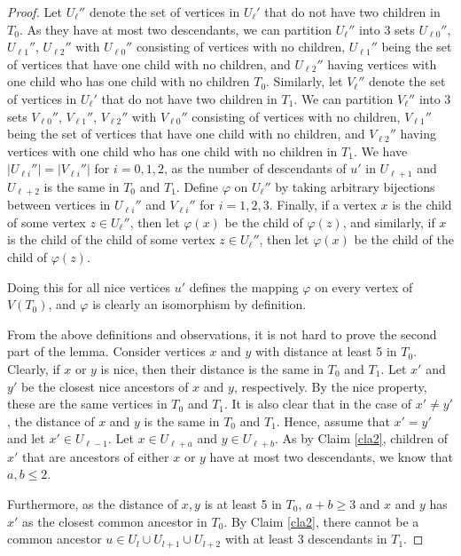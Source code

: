 \documentclass[10pt,a4paper]{amsart}
\begin{document}
\begin{proof}
Let $U_\ell''$ denote the set of vertices in $U_\ell'$ that do not have two children in $T_0$. As they have at most two descendants, we can partition $U_\ell''$ into $3$ sets $U_{\ell 0}''$, $U_{\ell 1}''$, $U_{\ell 2}''$ with $U_{\ell 0}''$ consisting of vertices with no children, $U_{\ell 1}''$ being the set of vertices that have one child with no children, and $U_{\ell 2}''$ having vertices with one child who has one child with no children $T_0$. Similarly, let $V_\ell''$ denote the set of vertices in $U_\ell'$ that do not have two children in $T_1$. We can partition $V_\ell''$ into $3$ sets $V_{\ell 0}''$, $V_{\ell 1}''$, $V_{\ell 2}''$ with $V_{\ell 0}''$ consisting of vertices with no children, $V_{\ell 1}''$ being the set of vertices that have one child with no children, and $V_{\ell 2}''$ having vertices with one child who has one child with no children in $T_1$. 
We have $|U_{\ell i}''|=|V_{\ell i}''|$ for $i=0,1,2$, as the number of descendants of $u'$ in $U_{\ell+1}$ and $U_{\ell+2}$ is the same in $T_0$ and $T_1$.
Define $\varphi$ on $U_\ell''$ by taking arbitrary bijections between vertices in $U_{\ell i}''$ and $V_{\ell i}''$ for $i=1,2,3$. Finally, if a vertex $x$ is the child of some vertex $z \in U_\ell''$, then let $\varphi(x)$ be the child of $\varphi(z)$, and similarly, if $x$ is the child of the child of some vertex $z \in U_\ell''$, then let $\varphi(x)$ be the child of the child of $\varphi(z)$.

Doing this for all nice vertices $u'$ defines the mapping $\varphi$ on every vertex of $V(T_0)$, and $\varphi$ is clearly an isomorphism by definition.

From the above definitions and observations, it is not hard to prove the second part of the lemma. Consider vertices $x$ and $y$ with distance at least 5 in $T_0$. Clearly, if $x$ or $y$ is nice, then their distance is the same in $T_0$ and $T_1$. Let $x'$ and $y'$ be the closest nice ancestors of $x$ and $y$, respectively. By the nice property, these are the same vertices in $T_0$ and $T_1$. It is also clear that in the case of $x' \neq y'$, the distance of $x$ and $y$ is the same in $T_0$ and $T_1$. Hence, assume that $x'=y'$ and let $x' \in U_{\ell-1}$. Let $x \in U_{\ell+a}$ and $y \in U_{\ell+b}$. As by Claim \ref{cla2}, children of $x'$ that are ancestors of either $x$ or $y$ have at most two descendants, we know that $a,b \leq 2$. 

Furthermore, as the distance of $x,y$  is at least 5 in $T_0$, $a+b \geq 3$ and $x$ and $y$ has $x'$ as the closest common ancestor in $T_0$. By Claim \ref{cla2}, there cannot be a common ancestor $u \in U_{l} \cup U_{l+1} \cup U_{l+2}$ with at least 3 descendants in $T_1$.


\end{proof}
\end{document}

